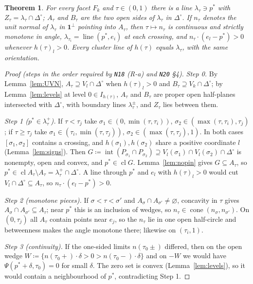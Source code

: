 \documentclass[11pt]{article}
\newtheorem{theorem}{Theorem}[section]
\theoremstyle{definition}
\theoremstyle{remark}
\newcommand{\one}{\mathbf 1}
\newcommand{\Di}{\Delta^{\circ}}
\newcommand{\cl}{\operatorname{cl}}
\newcommand{\lin}{\operatorname{line}}
\newcommand{\src}[1]{\texttt{#1}}
\begin{document}
\begin{theorem}\label{thm:pivot}
For every facet $F_k$ and $\tau\in(0,1)$ there is a line $\lambda_\tau\ni p^*$ with $Z_\tau=\lambda_\tau\cap\Di$; $A_\tau$ and $B_\tau$ are the two open sides of $\lambda_\tau$ in $\Di$. If $n_\tau$ denotes the unit normal of $\lambda_\tau$ in $\one^\perp$ pointing into $A_\tau$, then $\tau\mapsto n_\tau$ is continuous and strictly monotone in angle, $\lambda_{\tau_i}=\lin(p^*,e_i)$ at each crossing, and $n_\tau\cdot(e_l-p^*)>0$ whenever $h(\tau)_l>0$. Every cluster line of $h(\tau)$ equals $\lambda_\tau$, with the same orientation.
\end{theorem}
\begin{proof}[Proof (steps in the order required by \src{N18} (R-a) and \src{N20} \S4)]
\emph{Step 0.} By Lemma~\ref{lem:UVN}, $A_\tau\supseteq V_l\cap\Di$ when $h(\tau)_l>0$ and $B_\tau\supseteq V_k\cap\Di$; by Lemma~\ref{lem:levels} at level $0\in I_{h(\tau)}$, $A_\tau$ and $B_\tau$ are proper open half-planes intersected with $\Di$, with boundary lines $\lambda^\pm_\tau$, and $Z_\tau$ lies between them.

\emph{Step 1 ($p^*\in\lambda^+_\tau$).} If $\tau<\tau_j$ take $\sigma_1\in(0,\min(\tau,\tau_i))$, $\sigma_2\in(\max(\tau,\tau_i),\tau_j)$; if $\tau\ge\tau_j$ take $\sigma_1\in(\tau_i,\min(\tau,\tau_j))$, $\sigma_2\in(\max(\tau,\tau_j),1)$. In both cases $[\sigma_1,\sigma_2]$ contains a crossing, and $h(\sigma_1),h(\sigma_2)$ share a positive coordinate $l$ (Lemma~\ref{lem:signs}). Then $G\coloneqq\operatorname{int}(P_{\sigma_1}\cap P_{\sigma_2})\supseteq V_l(\sigma_1)\cap V_l(\sigma_2)\cap\Di$ is nonempty, open and convex, and $p^*\in\cl G$. Lemma~\ref{lem:nopin} gives $G\subseteq A_\tau$, so $p^*\in\cl A_\tau\setminus A_\tau=\lambda^+_\tau\cap\Di$. A line through $p^*$ and $e_l$ with $h(\tau)_l>0$ would cut $V_l\cap\Di\subseteq A_\tau$, so $n_\tau\cdot(e_l-p^*)>0$.

\emph{Step 2 (monotone pieces).} If $\sigma<\tau<\sigma'$ and $A_\sigma\cap A_{\sigma'}\ne\varnothing$, concavity in $\tau$ gives $A_\sigma\cap A_{\sigma'}\subseteq A_\tau$; near $p^*$ this is an inclusion of wedges, so $n_\tau\in\operatorname{cone}(n_\sigma,n_{\sigma'})$. On $(0,\tau_j)$ all $A_\tau$ contain points near $e_j$, so the $n_\tau$ lie in one open half-circle and betweenness makes the angle monotone there; likewise on $(\tau_i,1)$.

\emph{Step 3 (continuity).} If the one-sided limits $n(\tau_0\pm)$ differed, then on the open wedge $W\coloneqq\{n(\tau_0+)\cdot\delta>0>n(\tau_0-)\cdot\delta\}$ and on $-W$ we would have $\Psi(p^*+\delta,\tau_0)=0$ for small $\delta$. The zero set is convex (Lemma~\ref{lem:levels}), so it would contain a neighbourhood of $p^*$, contradicting Step 1.


\end{proof}
\end{document}

